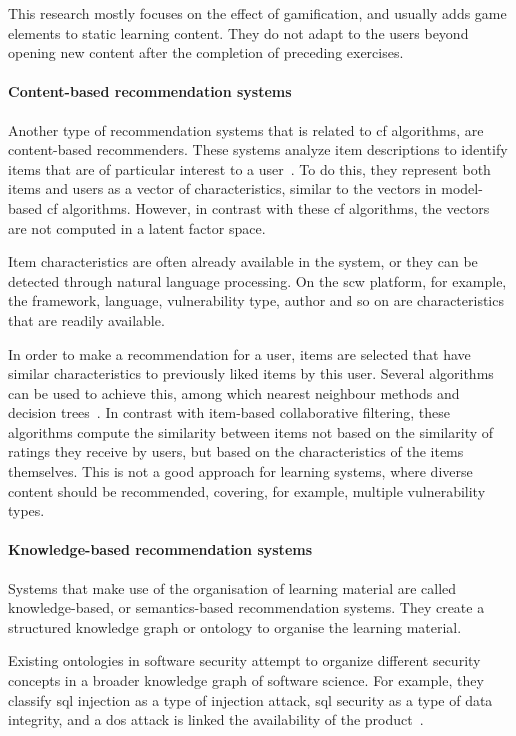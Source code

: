 This research mostly focuses on the effect of gamification, and usually adds game elements to static learning content.
They do not adapt to the users beyond opening new content after the completion of preceding exercises.

\paragraph{Content-based recommendation systems}
Another type of recommendation systems that is related to \gls{cf} algorithms, are content-based recommenders.
These systems analyze item descriptions to identify items that are of particular interest to a user~\cite{pazzani2007content}.
To do this, they represent both items and users as a vector of characteristics, similar to the vectors in model-based \gls{cf} algorithms.
However, in contrast with these \gls{cf} algorithms, the vectors are not computed in a latent factor space.

Item characteristics are often already available in the system, or they can be detected through natural language processing. 
On the \gls{scw} platform, for example, the framework, language, vulnerability type, author and so on are characteristics that are readily available.

In order to make a recommendation for a user, items are selected that have similar characteristics to previously liked items by this user.
Several algorithms can be used to achieve this, among which nearest neighbour methods and decision trees~\cite{pazzani2007content}.
In contrast with item-based collaborative filtering, these algorithms compute the similarity between items not based on the similarity of ratings they receive by users, but based on the characteristics of the items themselves.
This is not a good approach for learning systems, where diverse content should be recommended, covering, for example, multiple vulnerability types.

\paragraph{Knowledge-based recommendation systems}
Systems that make use of the organisation of learning material are called knowledge-based, or semantics-based recommendation systems.
They create a structured knowledge graph or ontology to organise the learning material.

Existing ontologies in software security attempt to organize different security concepts in a broader knowledge graph of software science.
For example, they classify \gls{sql} injection as a type of injection attack, \gls{sql} security as a type of data integrity, and a \gls{dos} attack is linked the availability of the product~\cite{kang2013security, jia2018practical}.

